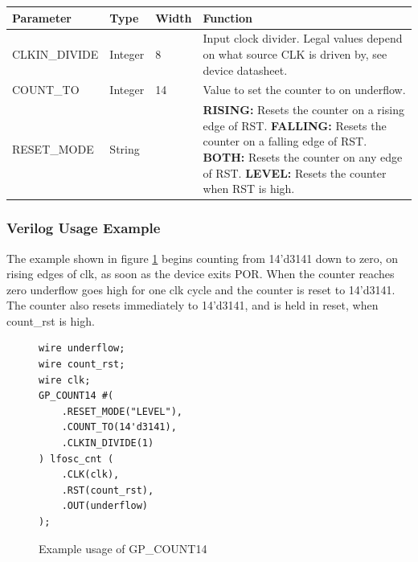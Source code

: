 \documentclass{article}
\begin{document}
\begin{tabularx}{5in}{|l|l|l|X|}
\hline
{\bfseries Parameter} & {\bfseries Type} & {\bfseries Width} & {\bfseries Function} \\
\hline
CLKIN\_DIVIDE & Integer & 8 &
	Input clock divider. Legal values depend on what source CLK is driven by, see device datasheet.\\
\hline
COUNT\_TO & Integer & 14 & Value to set the counter to on underflow. \\
\hline
RESET\_MODE & String &  & 
	{\bfseries RISING: } \newline Resets the counter on a rising edge of RST. \newline
	{\bfseries FALLING: } \newline Resets the counter on a falling edge of RST. \newline
	{\bfseries BOTH: } \newline Resets the counter on any edge of RST. \newline
	{\bfseries LEVEL: } \newline Resets the counter when RST is high. \\
\hline
\end{tabularx}

\pagebreak
\subsubsection{Verilog Usage Example}

The example shown in figure \ref{gp-count14-example} begins counting from 14'd3141 down to zero, on rising edges of clk,
as soon as the device exits POR. When the counter reaches zero underflow goes high for one clk cycle and the counter is 
reset to 14'd3141. The counter also resets immediately to 14'd3141, and is held in reset, when count\_rst is high.

\begin{figure}[h]
\begin{lstlisting}
wire underflow;
wire count_rst;
wire clk;
GP_COUNT14 #(
	.RESET_MODE("LEVEL"),
	.COUNT_TO(14'd3141),
	.CLKIN_DIVIDE(1)
) lfosc_cnt (
	.CLK(clk),
	.RST(count_rst),
	.OUT(underflow)
);
\end{lstlisting}
\caption{Example usage of GP\_COUNT14}
\label{gp-count14-example}
\end{figure}

\end{document}
